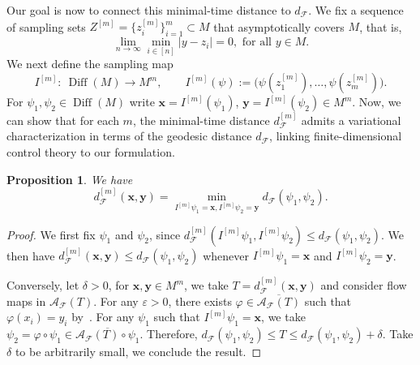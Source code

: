 \documentclass[12pt]{amsart}
\numberwithin{equation}{section}
\newtheorem{proposition}{Proposition}[section]
\theoremstyle{remark}
\begin{document}


Our goal is now to connect this minimal-time distance to $d_{\mathcal F}$.
We fix a sequence of sampling sets $Z^{[m]}=\{z^{[m]}_i\}_{i=1}^m\subset M$ that asymptotically covers $M$, that is,
\begin{equation}
  \label{eq:dense_samples}
    \lim_{n\to \infty} \min_{i\in [n]}|y-z_i| =0, \text{ for all } y\in M.
\end{equation}
We next define the sampling map
\begin{equation}
I^{[m]}:\ \operatorname{Diff}(M)\to M^m,\qquad
I^{[m]}(\psi):=\big(\psi(z^{[m]}_1),\dots,\psi(z^{[m]}_m)\big).
\end{equation}
For $\psi_1,\psi_2\in \operatorname{Diff}(M)$ write $\mathbf x=I^{[m]}(\psi_1)$, $\mathbf y=I^{[m]}(\psi_2)\in M^m$.
Now, we can show that for each $m$, the minimal-time distance $d_{\mathcal F}^{[m]}$ admits
a variational characterization in terms of the geodesic distance $d_{\mathcal F}$,
linking finite-dimensional control theory to our formulation.
\begin{proposition}
\label{prop:distance-finite}
    We have
    $$d_{\mathcal F}^{[m]}(\mathbf x, \mathbf y) = \min_{I^{[m]} \psi_1 = \mathbf x, I^{[m]}\psi_2=\mathbf y} d_{\mathcal F} (\psi_1,\psi_2).$$
\end{proposition}
\begin{proof}
We first fix $\psi_1$ and $\psi_2$, since $d^{[m]}_{\mathcal F}(I^{[m]}\psi_1, I^{[m]}\psi_2) \le d_{\mathcal F}(\psi_1,\psi_2).$ We then have $d_{\mathcal F}^{[m]}(\mathbf x, \mathbf y) \le d_{\mathcal F}(\psi_1,\psi_2)$ whenever $I^{[m]}\psi_1 = \mathbf x $ and $I^{[m]}\psi_2 = \mathbf y$.

Conversely, let $\delta>0$, for $\mathbf x, \mathbf y \in M^m$, we take $T = d^{[m]}_{\mathcal F}(\mathbf x,\mathbf y)$ and consider flow maps in $\mathcal A_{\mathcal F}(T)$. For any $\varepsilon > 0$, there exists $\varphi \in \overline{\mathcal A_{\mathcal F}(T)}$ such that $\varphi(x_i) = y_i$ by~.
For any $\psi_1$ such that $I^{[m]}\psi_1 = \mathbf x$, we take $\psi_2 = \varphi \circ \psi_1 \in \overline{\mathcal A_{\mathcal F}(T) \circ \psi_1}$. Therefore, $d_{\mathcal F}(\psi_1, \psi_2) \le T \le d_{\mathcal F}(\psi_1, \psi_2) + \delta$. Take $\delta$ to be arbitrarily small, we conclude the result.
\end{proof}
\end{document}
